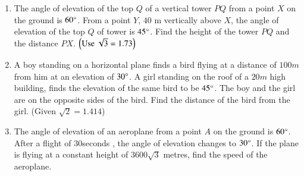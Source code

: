 \begin{enumerate}[label=\thesubsection.\arabic*.,ref=\thesubsection.\theenumi]
\hfill{}\item The angle of elevation of the top $Q$ of a vertical tower $PQ$ from a point $X$ on the ground is $ 60\degree $. From a point $Y$, $40$ m vertically above $X$, the angle of elevation of the top $Q$ of tower is $ 45 \degree $. Find the height of the tower $PQ$ and the distance $PX$. $\left(\text{Use }\sqrt{3} = 1.73\right)$\\
\hfill{}
\item A boy standing on a horizontal plane finds a bird flying at a distance of $100 m$ from him at an elevation of $30\degree$. A girl standing on the roof of a $20 m$ high building, finds the elevation of the same bird to be $45\degree$. The boy and the girl are on the opposite sides of the bird. Find the distance of the bird from the girl. (Given ${\sqrt 2}= 1.414$)

\hfill{}\item The angle of elevation of an aeroplane from a point $A$ on the ground is $60\degree$. After a flight of $30 $seconds , the angle of elevation changes to $30\degree$. If the plane is flying at a constant height of $3600\sqrt 3 $ metres, find the speed of the aeroplane.


\end{enumerate}
